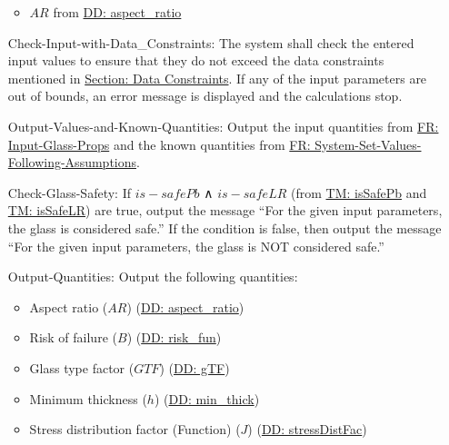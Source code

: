 \documentclass[12pt]{article}
\begin{document}
\begin{itemize}
\begin{itemize}
                                                                                                \item{$AR$ from \hyperref[DD:aspect.ratio]{DD: aspect\_ratio}}
                                                                                                \end{itemize}
\item[Check-Input-with-Data\_Constraints:\phantomsection\label{checkInputWithDataCons}]The system shall check the entered input values to ensure that they do not exceed the data constraints mentioned in \hyperref[Sec:DataConstraints]{Section: Data Constraints}. If any of the input parameters are out of bounds, an error message is displayed and the calculations stop.
\item[Output-Values-and-Known-Quantities:\phantomsection\label{outputValsAndKnownQuants}]Output the input quantities from \hyperref[inputGlassProps]{FR: Input-Glass-Props} and the known quantities from \hyperref[sysSetValsFollowingAssumps]{FR: System-Set-Values-Following-Assumptions}.
\item[Check-Glass-Safety:\phantomsection\label{checkGlassSafety}]If $is-safePb$ ∧ $is-safeLR$ (from \hyperref[TM:isSafePb]{TM: isSafePb} and \hyperref[TM:isSafeLR]{TM: isSafeLR}) are true, output the message ``For the given input parameters, the glass is considered safe.'' If the condition is false, then output the message ``For the given input parameters, the glass is NOT considered safe.''
\item[Output-Quantities:\phantomsection\label{outputQuants}]Output the following quantities:
                                                            \begin{itemize}
                                                            \item{Aspect ratio ($AR$) (\hyperref[DD:aspect.ratio]{DD: aspect\_ratio})}
                                                            \item{Risk of failure ($B$) (\hyperref[DD:risk.fun]{DD: risk\_fun})}
                                                            \item{Glass type factor ($GTF$) (\hyperref[DD:gTF]{DD: gTF})}
                                                            \item{Minimum thickness ($h$) (\hyperref[DD:min.thick]{DD: min\_thick})}
                                                            \item{Stress distribution factor (Function) ($J$) (\hyperref[DD:stressDistFac]{DD: stressDistFac})}

\end{itemize}
\end{itemize}
\end{document}

